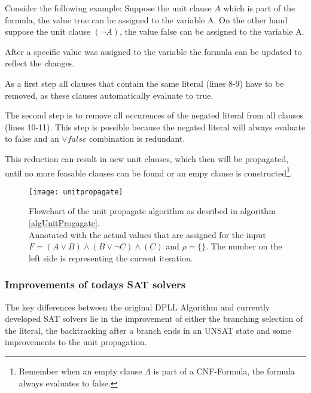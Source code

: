 Consider the following example: Suppose the unit clause $A$ which is part of the formula, the value true can be assigned to the variable A. On the other hand suppose the unit clause $(\lnot A)$, the value false can be assigned to the variable A.

After a specific value was assigned to the variable the formula can be updated to reflect the changes. 

As a first step all clauses that contain the same literal (lines 8-9) have to be removed, as these clauses automatically evaluate to true. 

The second step is to remove all occurences of the negated literal from all clauses (lines 10-11). This step is possible because the negated literal will always evaluate to false and an $\lor false$ combination is redundant.

This reduction can result in new unit clauses, which then will be propagated, until no more feasable clauses can be found or an empy clause is constructed\footnote{Remember when an empty clause $\Lambda$ is part of a CNF-Formula, the formula always evaluates to false.}.

\begin{figure}[H]
\texttt{[image: unitpropagate]}
\centering
\caption{Flowchart of the unit propagate algorithm as desribed in algorithm \ref{algUnitProgagate}.\\ Annotated with the actual values that are assigned for the input $F=(A \lor B ) \land (B \lor \lnot C) \land (C)$ and $\rho = \{\}$. The number on the left side is representing the current iteration.}
\label{fig:unitpropagate}
\end{figure}


\subsubsection{Improvements of todays SAT solvers}
The key differences between the original DPLL Algorithm and currently developed SAT solvers lie in the improvement of either the branching selection of the literal, the backtracking after a branch ends in an UNSAT state and some improvements to the unit propagation.
